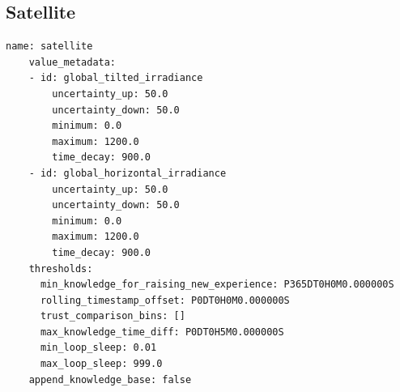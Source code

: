 \FloatBarrier
\subsection{Satellite}

\begin{lstlisting}[style=yaml]
    name: satellite
    value_metadata:
    - id: global_tilted_irradiance
        uncertainty_up: 50.0
        uncertainty_down: 50.0
        minimum: 0.0
        maximum: 1200.0
        time_decay: 900.0
    - id: global_horizontal_irradiance
        uncertainty_up: 50.0
        uncertainty_down: 50.0
        minimum: 0.0
        maximum: 1200.0
        time_decay: 900.0
    thresholds:
      min_knowledge_for_raising_new_experience: P365DT0H0M0.000000S
      rolling_timestamp_offset: P0DT0H0M0.000000S
      trust_comparison_bins: []
      max_knowledge_time_diff: P0DT0H5M0.000000S
      min_loop_sleep: 0.01
      max_loop_sleep: 999.0
    append_knowledge_base: false
\end{lstlisting}